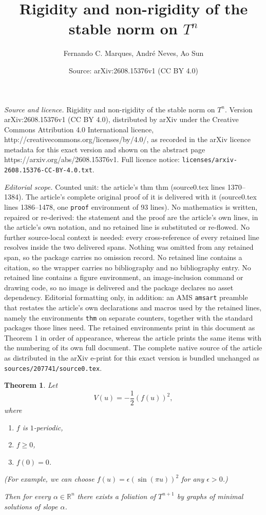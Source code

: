 \documentclass[10pt,a4paper]{amsart}
\title{Rigidity and non-rigidity of the stable norm on $T^n$}
\author{Fernando C. Marques, Andr\'e Neves, Ao Sun}
\date{Source: arXiv:2608.15376v1 (CC BY 4.0)}
\newtheorem{thm}{Theorem}
\begin{document}
\maketitle

\noindent\emph{Source and licence.} Rigidity and non-rigidity of the stable norm on $T^n$. Version arXiv:2608.15376v1 (CC BY 4.0), distributed by arXiv under the Creative Commons Attribution 4.0 International licence, http://creativecommons.org/licenses/by/4.0/, as recorded in the arXiv licence metadata for this exact version and shown on the abstract page https://arxiv.org/abs/2608.15376v1. Full licence notice: \texttt{licenses/arxiv-2608.15376-CC-BY-4.0.txt}.\par\smallskip

\noindent\textit{Editorial scope.} Counted unit: the article's thm thm (source0.tex lines 1370--1384). The article's complete original proof of it is delivered with it (source0.tex lines 1386--1478, one \texttt{proof} environment of 93 lines). No mathematics is written, repaired or re-derived: the statement and the proof are the article's own lines, in the article's own notation, and no retained line is substituted or re-flowed.  No further source-local context is needed: every cross-reference of every retained line resolves inside the two delivered spans.  Nothing was omitted from any retained span, so the package carries no omission record.  No retained line contains a citation, so the wrapper carries no bibliography and no bibliography entry.  No retained line contains a figure environment, an image-inclusion command or drawing code, so no image is delivered and the package declares no asset dependency.  Editorial formatting only, in addition: an AMS \texttt{amsart} preamble that restates the article's own declarations and macros used by the retained lines, namely the environments \texttt{thm} on separate counters, together with the standard packages those lines need.  The retained environments print in this document as Theorem 1 in order of appearance, whereas the article prints the same items with the numbering of its own full document.  The complete native source of the article as distributed in the arXiv e-print for this exact version is bundled unchanged as \texttt{sources/207741/source0.tex}.
		\begin{thm}
			Let 
			\begin{equation}
				V(u)=-\frac{1}{2}(f(u))^2,
			\end{equation}
			where 
			\begin{enumerate}
				\item $f$ is $1$-periodic,
				\item $f\geq 0$,
				\item $f(0)=0$.
			\end{enumerate}
			(For example, we can choose $f(u)=\epsilon(\sin(\pi u))^2$ for any $\epsilon>0$.)
			
			Then for every $\alpha \in \mathbb R^n$ there exists a foliation of $T^{n+1}$ by graphs of minimal solutions of slope $\alpha$.
		\end{thm}
\end{document}
